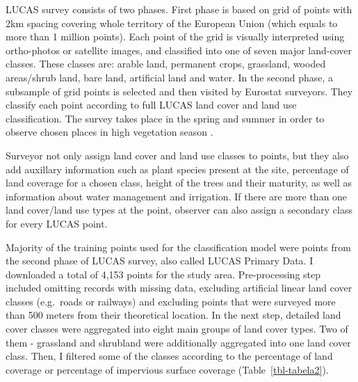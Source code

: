 \documentclass{amuthesis}
\begin{document}
LUCAS survey consists of two phases. First phase is based on grid of
points with 2km spacing covering whole territory of the European Union
(which equals to more than 1 million points). Each point of the grid is
visually interpreted using ortho-photos or satellite images, and
classified into one of seven major land-cover classes. These classes
are: arable land, permanent crops, grassland, wooded areas/shrub land,
bare land, artificial land and water. In the second phase, a subsample
of grid points is selected and then visited by Eurostat surveyors. They
classify each point according to full LUCAS land cover and land use
classification. The survey takes place in the spring and summer in order
to observe chosen places in high vegetation season
\autocite{dandrimont_harmonised_2020}.

Surveyor not only assign land cover and land use classes to points, but
they also add auxillary information such as plant species present at the
site, percentage of land coverage for a chosen class, height of the
trees and their maturity, as well as information about water management
and irrigation. If there are more than one land cover/land use types at
the point, observer can also assign a secondary class for every LUCAS
point.

Majority of the training points used for the classification model were
points from the second phase of LUCAS survey, also called LUCAS Primary
Data. I downloaded a total of 4,153 points for the study area.
Pre-processing step included omitting records with missing data,
excluding artificial linear land cover classes (e.g.~roads or railways)
and excluding points that were surveyed more than 500 meters from their
theoretical location. In the next step, detailed land cover classes were
aggregated into eight main groups of land cover types. Two of them -
grassland and shrubland were additionally aggregated into one land cover
class. Then, I filtered some of the classes according to the percentage
of land coverage or percentage of impervious surface coverage
(Table~\ref{tbl-tabela2}).
\end{document}
